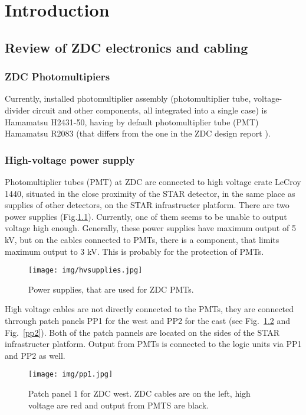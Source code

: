 \chapter{Introduction}

\section{Review of ZDC electronics and cabling}
\subsection{ZDC Photomultipiers}
Currently, installed photomultiplier assembly (photomultiplier tube, voltage-divider circuit and other components, all integrated into a single case) is Hamamatsu H2431-50, having by default photomultiplier tube (PMT) Hamamatsu R2083 \cite{PMTtube} (that differs from the one in the ZDC design report \cite{ZDCdocumentation}).

\subsection{High-voltage power supply}
Photomultiplier tubes (PMT) at ZDC are connected to high voltage crate LeCroy 1440, situated in the close proximity of the STAR detector, in the same place as supplies of other detectors, on the STAR
infrastructer platform. There are two power supplies (Fig.\ref{hvsupplies}). Currently, one of them seems to be unable to output voltage high enough. Generally, these power supplies have maximum output of 5 kV, but on the cables connected to PMTs, there is a component, that limits maximum output to 3 kV. This is probably for the protection of PMTs.

\begin{figure}[htb]
\begin{center}
\texttt{[image: img/hvsupplies.jpg]}
\end{center}
\caption{Power supplies, that are used for ZDC PMTs.}
\label{hvsupplies}
\end{figure}

High voltage cables are not directly connected to the PMTs, they are connected thrrough patch panels PP1 for the west and PP2 for the east (see Fig.~\ref{pp1} and Fig.~\ref{pp2}). Both of the patch pannels are located on the sides of the STAR infrastructer platform. Output from PMTs is connected to the logic units via PP1 and PP2 as well.

\begin{figure}[htb]
\begin{center}
\texttt{[image: img/pp1.jpg]}
\end{center}
\caption{Patch panel 1 for ZDC west.  ZDC cables are on the left, high voltage are red and output from PMTS are black.}
\label{pp1}
\end{figure}

